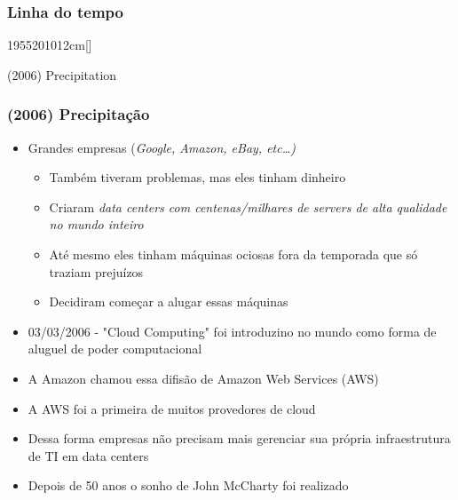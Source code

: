 \begin{frame}
	\frametitle{Linha do tempo}
	\begin{scriptsize}
	\begin{bf}
	\begin{center}
		\begin{chronology}[10]{1955}{2010}{12cm}[\textwidth]
			\color{lightgreen}
		\end{chronology}
	\end{center}
	\end{bf}
	\end{scriptsize}
	\begin{center}
		(2006) Precipitation
	\end{center}
\end{frame}

\begin{frame}
	\frametitle{(2006) Precipitação}
	\begin{itemize}
		\item Grandes empresas (\it{Google, Amazon, eBay, etc\dots})
			\begin{itemize}
				\item Também tiveram problemas, mas eles tinham dinheiro
				\item Criaram \it{data centers} com centenas/milhares de servers de alta qualidade no mundo inteiro
				\item Até mesmo eles tinham máquinas ociosas fora da temporada que só traziam prejuízos
				\item Decidiram começar a alugar essas máquinas
			\end{itemize}
		\item 03/03/2006 - "Cloud Computing" foi introduzino no mundo como forma de aluguel de poder computacional
		\item A Amazon chamou essa difisão de Amazon Web Services (AWS)
		\item A AWS foi a primeira de muitos provedores de cloud
		\item Dessa forma empresas não precisam mais gerenciar sua própria infraestrutura de TI em data centers
		\item Depois de 50 anos o sonho de John McCharty foi realizado
	\end{itemize}
\end{frame}

